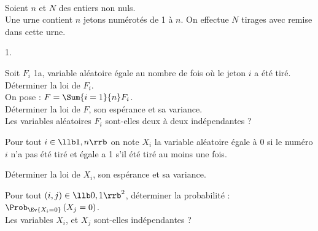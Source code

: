 \documentclass[11pt]{article}%
\begin{document}
\begin{exerciceSP}~\\
  Soient $n$ et $N$ des entiers non nuls. \\
  Une urne contient $n$ jetons numérotés de 1 à $n$. On effectue
  $N$ tirages avec remise dans cette urne.
  \begin{noliste}{1.}
    \setlength{\itemsep}{2mm}
  \item Soit $F_{i}$ 1a, variable aléatoire égale au nombre de fois où
    le jeton $i$ a été tiré.\\
    Déterminer la loi de $F_{i}$.\\[.2cm]
    On pose : $F = \Sum{i=1}{n}F_{i}$.\\
    Déterminer la loi de $F$, son espérance et sa variance.\\
    Les variables aléatoires $F_{i}$ sont-elles deux à deux
    indépendantes ?

  \item Pour tout $i\in \llb 1,n \rrb$ on note
    $X_{i}$ la variable aléatoire égale à $0$ si le numéro $i$ n'a
    pas été tiré et égale a 1 s'il été tiré au moins une fois.

    Déterminer la loi de $X_{i}$, son espérance et sa variance.

    Pour tout $\left( i,j\right) \in \llb 0,1\rrb^{2}$, déterminer la
    probabilité : $\Prob_{\Ev{X_{i}=0}} \left( X_{j}=0\right)$.\\
    Les variables $X_{i}$, et $X_{j}$ sont-elles indépendantes ?
  \end{noliste}
\end{exerciceSP}


\end{document}
